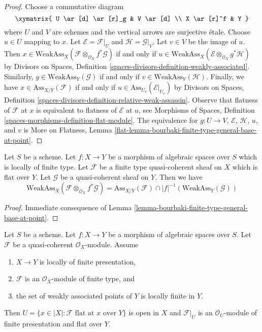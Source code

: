 \begin{proof}
Choose a commutative diagram
$$
\xymatrix{
U \ar[d] \ar[r]_g & V \ar[d] \\
X \ar[r]^f & Y
}
$$
where $U$ and $V$ are schemes and the vertical arrows are surjective \'etale.
Choose $u \in U$ mapping to $x$. Let $\mathcal{E} = \mathcal{F}|_U$
and $\mathcal{H} = \mathcal{G}|_V$.
Let $v \in V$ be the image of $u$. Then
$x \in \text{WeakAss}_X(\mathcal{F} \otimes_{\mathcal{O}_X} f^*\mathcal{G})$
if and only if
$u \in \text{WeakAss}_X(\mathcal{E} \otimes_{\mathcal{O}_X} g^*\mathcal{H})$
by Divisors on Spaces, Definition
\ref{spaces-divisors-definition-weakly-associated}.
Similarly, $y \in \text{WeakAss}_Y(\mathcal{G})$ if and only if
$v \in \text{WeakAss}_V(\mathcal{H})$.
Finally, we have $x \in \text{Ass}_{X/Y}(\mathcal{F})$ if and only if
$u \in \text{Ass}_{U_v}(\mathcal{E}|_{U_v})$ by
Divisors on Spaces, Definition
\ref{spaces-divisors-definition-relative-weak-assassin}.
Observe that flatness of $\mathcal{F}$ at $x$ is
equivalent to flatness of $\mathcal{E}$ at $u$, see
Morphisms of Spaces, Definition \ref{spaces-morphisms-definition-flat-module}.
The equivalence for $g : U \to V$, $\mathcal{E}$, $\mathcal{H}$, $u$, and $v$
is More on Flatness, Lemma
\ref{flat-lemma-bourbaki-finite-type-general-base-at-point}.
\end{proof}

\begin{lemma}
\label{lemma-bourbaki-finite-type-general-base}
Let $S$ be a scheme. Let $f : X \to Y$ be a morphism of algebraic spaces
over $S$ which is locally of finite type.
Let $\mathcal{F}$ be a finite type quasi-coherent sheaf on $X$
which is flat over $Y$. Let $\mathcal{G}$ be a quasi-coherent sheaf on $Y$.
Then we have
$$
\text{WeakAss}_X(\mathcal{F} \otimes_{\mathcal{O}_X} f^*\mathcal{G}) =
\text{Ass}_{X/Y}(\mathcal{F}) \cap
|f|^{-1}(\text{WeakAss}_Y(\mathcal{G}))
$$
\end{lemma}

\begin{proof}
Immediate consequence of
Lemma \ref{lemma-bourbaki-finite-type-general-base-at-point}.
\end{proof}

\begin{theorem}
\label{theorem-finite-type-flat}
Let $S$ be a scheme.
Let $f : X \to Y$ be a morphism of algebraic spaces over $S$.
Let $\mathcal{F}$ be a quasi-coherent $\mathcal{O}_X$-module.
Assume
\begin{enumerate}
\item $X \to Y$ is locally of finite presentation,
\item $\mathcal{F}$ is an $\mathcal{O}_X$-module of finite type, and
\item the set of weakly associated points of $Y$ is locally finite in $Y$.
\end{enumerate}
Then $U = \{x \in |X| : \mathcal{F}\text{ flat at }x\text{ over }Y\}$
is open in $X$ and $\mathcal{F}|_U$ is an $\mathcal{O}_U$-module
of finite presentation and flat over $Y$.
\end{theorem}

